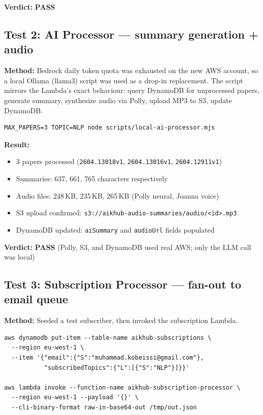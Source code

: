 \documentclass[11pt,a4paper]{article}
\begin{document}
\textbf{Verdict:} \textcolor{green!60!black}{\textbf{PASS}}

\subsection{Test 2: AI Processor --- summary generation + audio}

\textbf{Method:} Bedrock daily token quota was exhausted on the new AWS account, so a local Ollama (llama3) script was used as a drop-in replacement. The script mirrors the Lambda's exact behaviour: query DynamoDB for unprocessed papers, generate summary, synthesize audio via Polly, upload MP3 to S3, update DynamoDB.

\begin{lstlisting}[basicstyle=\ttfamily\small]
MAX_PAPERS=3 TOPIC=NLP node scripts/local-ai-processor.mjs
\end{lstlisting}

\textbf{Result:}
\begin{itemize}[leftmargin=*]
  \item 3 papers processed (\texttt{2604.13018v1}, \texttt{2604.13016v1}, \texttt{2604.12911v1})
  \item Summaries: 637, 661, 765 characters respectively
  \item Audio files: 248\,KB, 235\,KB, 265\,KB (Polly neural, Joanna voice)
  \item S3 upload confirmed: \texttt{s3://aikhub-audio-summaries/audio/<id>.mp3}
  \item DynamoDB updated: \texttt{aiSummary} and \texttt{audioUrl} fields populated
\end{itemize}

\textbf{Verdict:} \textcolor{green!60!black}{\textbf{PASS}} (Polly, S3, and DynamoDB used real AWS; only the LLM call was local)

\subsection{Test 3: Subscription Processor --- fan-out to email queue}

\textbf{Method:} Seeded a test subscriber, then invoked the subscription Lambda.
\begin{lstlisting}[basicstyle=\ttfamily\small]
aws dynamodb put-item --table-name aikhub-subscriptions \
  --region eu-west-1 \
  --item '{"email":{"S":"muhammad.kobeissi@gmail.com"},
           "subscribedTopics":{"L":[{"S":"NLP"}]}}'

aws lambda invoke --function-name aikhub-subscription-processor \
  --region eu-west-1 --payload '{}' \
  --cli-binary-format raw-in-base64-out /tmp/out.json
\end{lstlisting}
\end{document}
